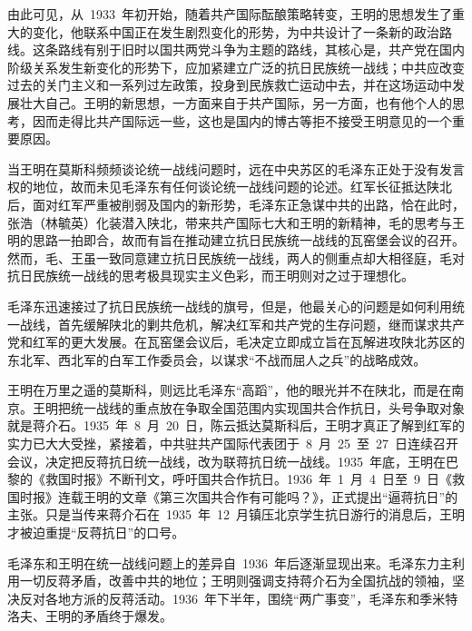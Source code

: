 由此可见，从~1933~年初开始，随着共产国际酝酿策略转变，王明的思想发生了重大的变化，他联系中国正在发生剧烈变化的形势，为中共设计了一条新的政治路线。这条路线有别于旧时以国共两党斗争为主题的路线，其核心是，共产党在国内阶级关系发生新变化的形势下，应加紧建立广泛的抗日民族统一战线；中共应改变过去的关门主义和一系列过左政策，投身到民族救亡运动中去，并在这场运动中发展壮大自己。王明的新思想，一方面来自于共产国际，另一方面，也有他个人的思考，因而走得比共产国际远一些，这也是国内的博古等拒不接受王明意见的一个重要原因。

当王明在莫斯科频频谈论统一战线问题时，远在中央苏区的毛泽东正处于没有发言权的地位，故而未见毛泽东有任何谈论统一战线问题的论述。红军长征抵达陕北后，面对红军严重被削弱及国内的新形势，毛泽东正急谋中共的出路，恰在此时，张浩（林毓英）化装潜入陕北，带来共产国际七大和王明的新精神，毛的思考与王明的思路一拍即合，故而有旨在推动建立抗日民族统一战线的瓦窑堡会议的召开。然而，毛、王虽一致同意建立抗日民族统一战线，两人的侧重点却大相径庭，毛对抗日民族统一战线的思考极具现实主义色彩，而王明则对之过于理想化。

毛泽东迅速接过了抗日民族统一战线的旗号，但是，他最关心的问题是如何利用统一战线，首先缓解陕北的剿共危机，解决红军和共产党的生存问题，继而谋求共产党和红军的更大发展。在瓦窑堡会议后，毛决定立即成立旨在瓦解进攻陕北苏区的东北军、西北军的白军工作委员会，以谋求“不战而屈人之兵”的战略成效。

王明在万里之遥的莫斯科，则远比毛泽东“高蹈”，他的眼光并不在陕北，而是在南京。王明把统一战线的重点放在争取全国范围内实现国共合作抗日，头号争取对象就是蒋介石。1935~年~8~月~20~日，陈云抵达莫斯科后，王明才真正了解到红军的实力已大大受挫，紧接着，中共驻共产国际代表团于~8~月~25~至~27~日连续召开会议，决定把反蒋抗日统一战线，改为联蒋抗日统一战线。1935~年底，王明在巴黎的《救国时报》不断刊文，呼吁国共合作抗日。1936~年~1~月~4~日至~9~日《救国时报》连载王明的文章《第三次国共合作有可能吗？》，正式提出“逼蒋抗日”的主张。只是当传来蒋介石在~1935~年~12~月镇压北京学生抗日游行的消息后，王明才被迫重提“反蒋抗日”的口号。

毛泽东和王明在统一战线问题上的差异自~1936~年后逐渐显现出来。毛泽东力主利用一切反蒋矛盾，改善中共的地位；王明则强调支持蒋介石为全国抗战的领袖，坚决反对各地方派的反蒋活动。1936~年下半年，围绕“两广事变”，毛泽东和季米特洛夫、王明的矛盾终于爆发。

